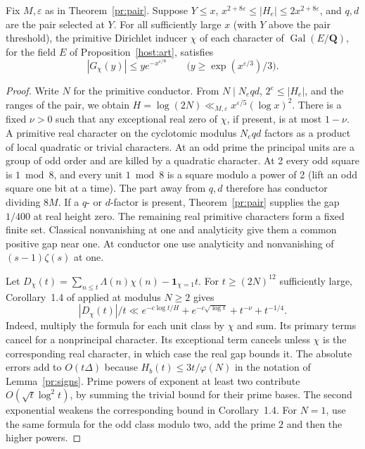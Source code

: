 \begin{proposition}\label{host:thin}
Fix \(M,\varepsilon\) as in Theorem~\ref{pr:pair}. Suppose
\(Y\le x\), \(x^{2+8\varepsilon}\le |H_e|\le2x^{2+8\varepsilon}\),
and \(q,d\) are the pair selected at \(Y\). For all sufficiently large
\(x\) (with \(Y\) above the pair threshold), the primitive Dirichlet inducer
\(\chi\) of each character of \(\operatorname{Gal}(E/\mathbf Q)\), for the field \(E\) of Proposition~\ref{host:art}, satisfies
\[
        |G_\chi(y)|\le y e^{-x^{\varepsilon/8}}
        \qquad \bigl(y\ge \exp(x^{\varepsilon/3})/3\bigr).
\]
\end{proposition}
\begin{proof}
Write \(N\) for the primitive conductor. From \(N\mid N_eqd\),
\(2^e\le|H_e|\), and the ranges of the pair, we obtain
\(H=\log(2N)\ll_{M,\varepsilon}x^{\varepsilon/5}(\log x)^2\).
There is a fixed \(\nu>0\) such that any exceptional real zero of \(\chi\),
if present, is at most \(1-\nu\). A primitive real character
on the cyclotomic modulus \(N_eqd\) factors as a product of local
quadratic or trivial characters. At an odd prime the principal units
are a group of odd order and are killed by a quadratic character.
At 2 every odd square is \(1\bmod8\), and every unit \(1\bmod8\) is
a square modulo a power of 2 (lift an odd square one bit at a time).
The part away from \(q,d\) therefore has conductor dividing \(8M\).
If a \(q\)- or \(d\)-factor is present, Theorem~\ref{pr:pair} supplies
the gap \(1/400\) at real height zero. The remaining real primitive
characters form a fixed finite set. Classical nonvanishing at one and
analyticity give them a common positive gap near one. At conductor one
use analyticity and nonvanishing of \((s-1)\zeta(s)\) at one.

Let \(D_\chi(t)=\sum_{n\le t}\Lambda(n)\chi(n)
-\mathbf1_{\chi=1}t\).
For \(t\ge(2N)^{12}\) sufficiently large, Corollary~1.4 of \cite{tz}
applied at modulus \(N\ge2\) gives
\[
 |D_\chi(t)|/t\ll
 e^{-c\log t/H}+e^{-c\sqrt{\log t}}+t^{-\nu}+t^{-1/4}.
\]
Indeed, multiply the formula for each unit class by \(\chi\) and sum.
Its primary terms cancel for a nonprincipal character. Its exceptional
term cancels unless \(\chi\) is the corresponding real character, in
which case the real gap bounds it. The absolute errors add to
\(O(t\Delta)\) because \(H_b(t)\le 3t/\varphi(N)\) in the notation
of Lemma~\ref{pr:signs}. Prime powers of exponent at least two contribute
\(O(\sqrt t\log^2t)\), by summing the trivial bound for their prime bases.
The second exponential weakens the corresponding bound in Corollary~1.4.
For \(N=1\), use the same formula for the odd class modulo two, add the
prime \(2\) and then the higher powers.


\end{proof}
